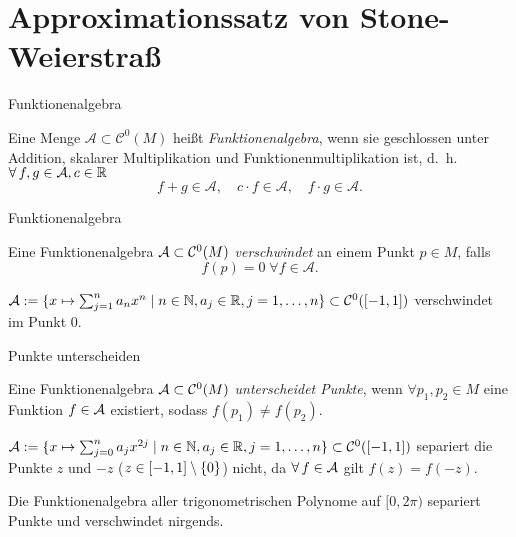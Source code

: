 \section{Approximationssatz von Stone-Weierstraß}

\begin{frame}{Funktionenalgebra}
    \begin{defi}[Funktionenalgebra]
        Eine Menge \( \mathcal{A} \subset \mathcal{C}^0(M) \) heißt 
        \textit{Funktionenalgebra}, wenn sie geschlossen unter Addition, 
        skalarer Multiplikation und Funktionenmultiplikation ist, 
        d.~h. \( \forall f,g \in \A, c \in \mathbb{R} \)
        \[ f + g \in \mathcal{A}, \quad c \cdot f \in \mathcal{A}, \quad f \cdot g \in \mathcal{A}. \]
    \end{defi}
\end{frame}

\begin{frame}{Funktionenalgebra}
    \begin{defi}[Verschwinden]
        Eine Funktionenalgebra \(\mathcal{A} \subset \mathcal{C}^0(M)\) 
        \textit{verschwindet} an einem Punkt \(p \in M\), falls 
        \[ f(p) = 0 \;\forall f \in \mathcal{A}. \]
    \end{defi}
    \pause
    \begin{bsp}
        \( \mathcal{A} := \{ x \mapsto \sum_{j=1}^n a_n x^n \;|\; n\in \mathbb{N}, a_j \in \mathbb{R}, j = 1,\ldots, n \} \subset \mathcal{C}^0([-1,1]) \) 
        verschwindet im Punkt \(0\).
    \end{bsp}
\end{frame}

\begin{frame}{Punkte unterscheiden}
    \begin{defi}
        Eine Funktionenalgebra \(\mathcal{A} \subset \mathcal{C}^0(M)\) \textit{unterscheidet Punkte}, 
        wenn \( \forall p_1, p_2 \in M \) eine Funktion \(f \in \mathcal{A}\) existiert, 
        sodass \( f(p_1) \neq f(p_2) \).
    \end{defi}
    \pause
    \begin{bsp}
        \( \mathcal{A} := \{ x \mapsto \sum_{j=0}^n a_{j} x^{2j} \;|\; n\in\mathbb{N}, a_j \in \mathbb{R}, j = 1,\ldots, n \} 
        \subset \mathcal{C}^0([-1,1]) \)
        separiert die Punkte \( z \) und \(-z\) (\(z \in [-1,1] \setminus \{0\} \)) nicht, da \( \forall f \in \A \) gilt 
        \( f(z) = f(-z) \).
    \end{bsp}
    \pause
    \begin{bsp}
        Die Funktionenalgebra aller trigonometrischen Polynome auf \( [0,2\pi) \) 
        separiert Punkte und verschwindet nirgends.
    \end{bsp}
\end{frame}


